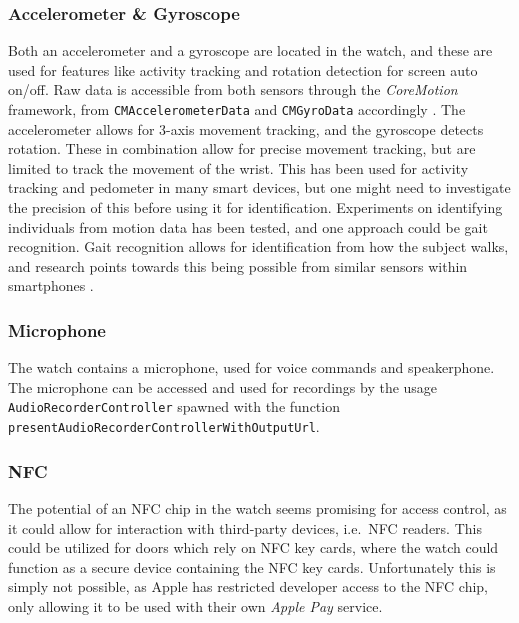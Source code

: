 \subsubsection{Accelerometer \& Gyroscope}
Both an accelerometer and a gyroscope are located in the watch, and these are
used for features like activity tracking and rotation detection for screen
auto on/off. Raw data is accessible from both sensors through the
\textit{CoreMotion} framework, from \texttt{CMAccelerometerData} and
\texttt{CMGyroData} accordingly \cite{coremotionfw}. The accelerometer allows
for 3-axis movement tracking, and the gyroscope detects rotation. These in
combination allow for precise movement tracking, but are limited to track the
movement of the wrist. This has been used for activity tracking and pedometer 
in many smart devices, but one might need to investigate the precision of this
before using it for identification. 
Experiments on identifying individuals from motion data has been tested, and
one approach could be gait recognition. Gait recognition allows for
identification from how the subject walks, and research points towards this
being possible from similar sensors within smartphones \cite{7181946}. 

\subsubsection{Microphone}
The watch contains a microphone, used for voice commands and speakerphone. The
microphone can be accessed and used for recordings by the usage
\texttt{AudioRecorderController} spawned with the function
\texttt{presentAudioRecorderControllerWithOutputUrl}. 


\subsubsection{NFC}
The potential of an NFC chip in the watch seems promising for access control, as
it could allow for interaction with third-party devices, i.e.\ NFC readers. This
could be utilized for doors which rely on NFC key cards, where the watch could
function as a secure device containing the NFC key cards. 
Unfortunately this is simply not possible, as Apple has restricted developer 
access to the NFC chip, only allowing it to be used with their own \textit{Apple
    Pay} service. 

